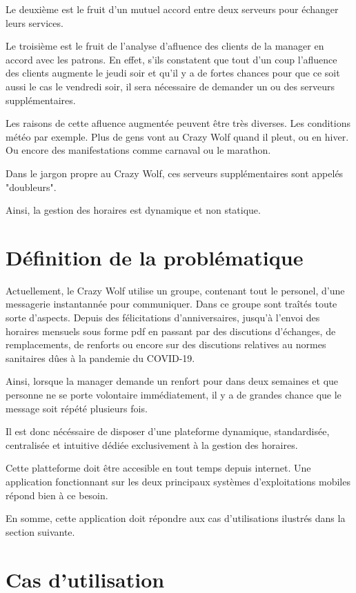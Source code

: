Le deuxième est le fruit d'un mutuel accord entre deux serveurs pour échanger leurs services.

Le troisième est le fruit de l'analyse d'afluence des clients de la manager en accord avec les patrons. En effet, s'ils constatent que tout d'un coup l'afluence des clients augmente le jeudi soir et qu'il y a de fortes chances pour que ce soit aussi le cas le vendredi soir, il sera nécessaire de demander un ou des serveurs supplémentaires. 

Les raisons de cette afluence augmentée peuvent être très diverses. Les conditions météo par exemple. Plus de gens vont au Crazy Wolf quand il pleut, ou en hiver. Ou encore des manifestations comme carnaval ou le marathon.

Dans le jargon propre au Crazy Wolf, ces serveurs supplémentaires sont appelés "doubleurs".

Ainsi, la gestion des horaires est dynamique et non statique.

\section[Problématique]{Définition de la problématique}
Actuellement, le Crazy Wolf utilise un groupe, contenant tout le personel, d'une messagerie instantannée pour communiquer. Dans ce groupe sont traîtés toute sorte d'aspects. Depuis des félicitations d'anniversaires, jusqu'à l'envoi des horaires mensuels sous forme pdf en passant par des discutions d'échanges, de remplacements, de renforts ou encore sur des discutions relatives au normes sanitaires dûes à la pandemie du COVID-19. 

Ainsi, lorsque la manager demande un renfort pour dans deux semaines et que personne ne se porte volontaire immédiatement, il y a de grandes chance que le message soit répété plusieurs fois.

Il est donc nécéssaire de disposer d'une plateforme dynamique, standardisée, centralisée et intuitive dédiée exclusivement à la gestion des horaires. 

Cette platteforme doit être accesible en tout temps depuis internet. Une application fonctionnant sur les deux principaux systèmes d'exploitations mobiles répond bien à ce besoin.

En somme, cette application doit répondre aux cas d'utilisations ilustrés dans la section suivante.
\section[Use case]{Cas d'utilisation}
\blindtext
